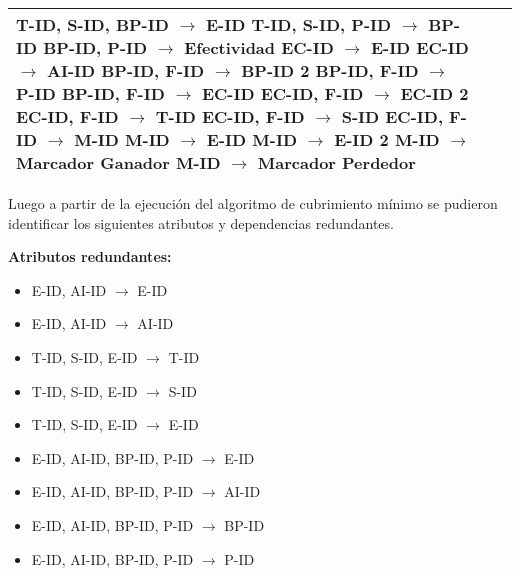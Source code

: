 \documentclass{report}
\begin{document}
\begin{tabularx}{\textwidth}{|X|X|X|}
        T-ID, S-ID, BP-ID $\rightarrow$ E-ID \newline 
        T-ID, S-ID, P-ID $\rightarrow$ BP-ID \newline 
        BP-ID, P-ID $\rightarrow$ Efectividad \newline 
        EC-ID $\rightarrow$ E-ID \newline 
        EC-ID $\rightarrow$ AI-ID \newline 
        BP-ID, F-ID $\rightarrow$ BP-ID 2 \newline 
        BP-ID, F-ID $\rightarrow$ P-ID \newline 
        BP-ID, F-ID $\rightarrow$ EC-ID \newline 
        EC-ID, F-ID $\rightarrow$ EC-ID 2 \newline 
        EC-ID, F-ID $\rightarrow$ T-ID \newline 
        EC-ID, F-ID $\rightarrow$ S-ID \newline 
        EC-ID, F-ID $\rightarrow$ M-ID \newline 
        M-ID $\rightarrow$ E-ID \newline 
        M-ID $\rightarrow$ E-ID 2 \newline 
        M-ID $\rightarrow$ Marcador Ganador \newline 
        M-ID $\rightarrow$ Marcador Perdedor  \\
        \bottomrule
    \end{tabularx}

    \newpage

    Luego a partir de la ejecución del algoritmo de cubrimiento mínimo se pudieron identificar los siguientes atributos y dependencias redundantes. \newline

    \textbf{Atributos redundantes:}
    \begin{itemize}
        \item E-ID,  AI-ID $\rightarrow$ E-ID
        \item E-ID,  AI-ID $\rightarrow$ AI-ID
        \item T-ID,  S-ID,  E-ID $\rightarrow$ T-ID
        \item T-ID,  S-ID,  E-ID $\rightarrow$ S-ID
        \item T-ID,  S-ID,  E-ID $\rightarrow$ E-ID
        \item E-ID,  AI-ID,  BP-ID,  P-ID $\rightarrow$ E-ID
        \item E-ID,  AI-ID,  BP-ID,  P-ID $\rightarrow$ AI-ID
        \item E-ID,  AI-ID,  BP-ID,  P-ID $\rightarrow$ BP-ID
        \item E-ID,  AI-ID,  BP-ID,  P-ID $\rightarrow$ P-ID
    \end{itemize}
   
\end{document}
